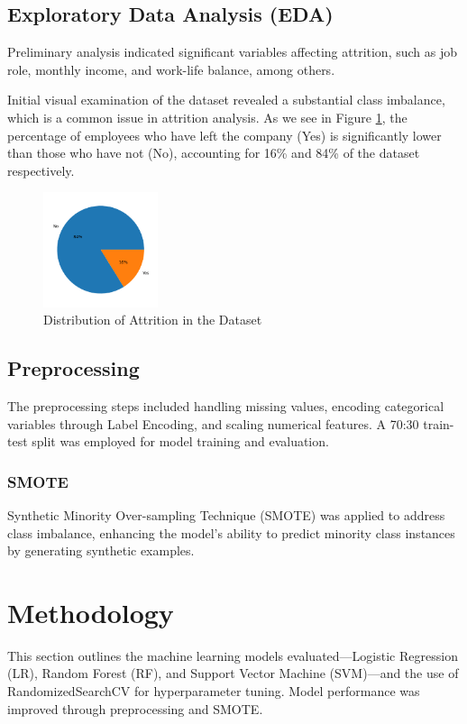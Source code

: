 \documentclass[12pt, twocolumn]{article}
\begin{document}
	
	\subsection{Exploratory Data Analysis (EDA)}
	Preliminary analysis indicated significant variables affecting attrition, such as job role, monthly income, and work-life balance, among others.
	
	Initial visual examination of the dataset revealed a substantial class imbalance, which is a common issue in attrition analysis. As we see in Figure \ref{fig:attrition_pie_chart}, the percentage of employees who have left the company (Yes) is significantly lower than those who have not (No), accounting for 16\% and 84\% of the dataset respectively.
	
	\begin{figure}[H]
		\centering
		\includegraphics[width=0.3\textwidth]{class01.png}
		\caption{Distribution of Attrition in the Dataset}
		\label{fig:attrition_pie_chart}
	\end{figure}
	
	\subsection{Preprocessing}
	The preprocessing steps included handling missing values, encoding categorical variables through Label Encoding, and scaling numerical features. A 70:30 train-test split was employed for model training and evaluation.
	
	\subsubsection{SMOTE}
	Synthetic Minority Over-sampling Technique (SMOTE) was applied to address class imbalance, enhancing the model's ability to predict minority class instances by generating synthetic examples.
	
	\section{Methodology}
	This section outlines the machine learning models evaluated—Logistic Regression (LR), Random Forest (RF), and Support Vector Machine (SVM)—and the use of RandomizedSearchCV for hyperparameter tuning. Model performance was improved through preprocessing and SMOTE.
	
\end{document}
